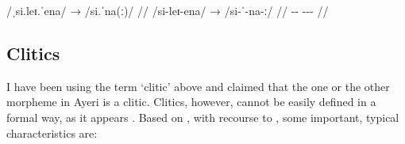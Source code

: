 \ex[everygla=\upshape]\label{ex:relprostress}%
\begingl
	\gla /ˌsi.leɪ.ˈena/ → /si.ˈna(ː)/ //
	\glb /si-leɪ-ena/ → /si-ˈ-na-ː/ //
	\glc \Rel{}-\PargI{}-\Gen{} {} \Rel{}-\Agr{}-\Gen{}-\Agr{} //
\endgl\xe


\subsection{Clitics}
\label{subsec:clitics}

I have been using the term `clitic' above and claimed that the one or the other
morpheme in Ayeri is a clitic. Clitics, however, cannot be easily defined in a
formal way, as it appears \citep[126]{spencerluis2012}. Based on
\citet{spencerluis2012}, with recourse to \citet{zwickypullum1983}, some
important, typical characteristics are:

